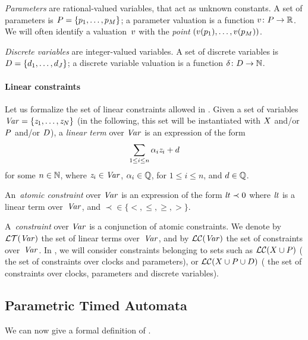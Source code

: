 \emph{Parameters} are rational-valued variables, that act as unknown constants.
A set of parameters is $P = \{ p_1, \dots, p_M \} $;
a parameter valuation is a function $v\colon P \rightarrow {\mathbb R}$.
We will often identify a valuation~$v$ with the \emph{point} $(v(p_1), \dots, v(p_{M}))$.

\emph{Discrete variables} are integer-valued variables.
A set of discrete variables is $D = \{ d_1, \dots, d_J \} $;
a discrete variable valuation is a function $\delta \colon D \rightarrow {\mathbb N}$.


\paragraph{Linear constraints}
Let us formalize the set of linear constraints allowed in \imitator{}.
Given a set of variables~$\mathit{Var} = \{ \mathit{z}_1, \dots, \mathit{z}_N \}$ (in the following, this set will be instantiated with $X$ and/or $P$ and/or $D$), a \emph{linear term} over $\mathit{Var}$ is an expression of the form
$$
\sum_{1 \leq i \leq n} \alpha_i \mathit{z}_i + d
$$
for some $n \in {\mathbb N}$,
	where
	$\mathit{z}_{i} \in \mathit{Var}$,
	$\alpha_{i} \in {\mathbb Q}$, for $1 \leq i \leq n$,
	and
	$d \in {\mathbb Q}$.

An~\emph{atomic constraint} over $\mathit{Var}$ is an expression of the form
$
\mathit{lt} \prec 0
$
	where
	$\mathit{lt}$ is a linear term over~$\mathit{Var}$,
	and
	$\prec \in \{<, \leq, \geq, >\}$.

A~\emph{constraint} over $\mathit{Var}$ is a conjunction of atomic constraints.
We denote by $\mathcal{LT}(\mathit{Var})$ the set of linear terms over~$\mathit{Var}$, and by $\mathcal{LC}(\mathit{Var})$ the set of constraints over~$\mathit{Var}$.
In \imitator{}, we will consider constraints belonging to sets such as $\mathcal{LC}(X \cup P)$ (\ie{} the set of constraints over clocks and parameters), or $\mathcal{LC}(X \cup P \cup D)$ (\ie{} the set of constraints over clocks, parameters and discrete variables).


\subsection{\imitator{} Parametric Timed Automata}


We can now give a formal definition of \IPTA{}.

